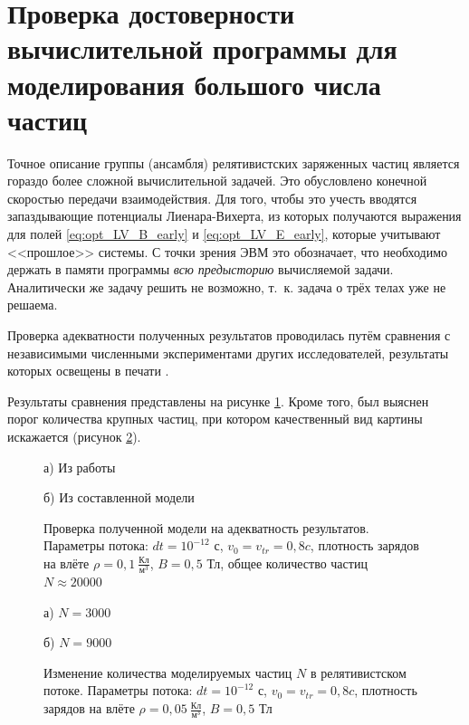 \section{Проверка достоверности вычислительной программы для моделирования большого числа частиц}

Точное описание группы (ансамбля) релятивистских заряженных частиц является гораздо более сложной вычислительной задачей. Это обусловлено конечной скоростью передачи взаимодействия. Для того, чтобы это учесть вводятся запаздывающие потенциалы Лиенара-Вихерта, из которых получаются выражения для полей \eqref{eq:opt_LV_B_early} и \eqref{eq:opt_LV_E_early}, которые учитывают <<прошлое>> системы. 
С точки зрения ЭВМ это обозначает, что необходимо держать в памяти программы \textit{всю предысторию} вычисляемой задачи.
Аналитически же задачу решить не возможно, т.~к. задача о трёх телах уже не решаема. 

Проверка адекватности полученных результатов проводилась путём сравнения с независимыми численными экспериментами других исследователей, результаты которых освещены в печати \cite{kd2004,Kovtun2005,Kovtun2010,Kravchenya2010}.

Результаты сравнения представлены на рисунке \ref{fig:check1}. Кроме того, был выяснен порог количества крупных частиц, при котором качественный вид картины искажается (рисунок \ref{fig:check2}).


\begin{figure}[h!]
\begin{minipage}[h]{0.9\linewidth}
 а) Из работы \cite{kd2004} \\
\end{minipage}
\vfill
\begin{minipage}[h]{0.9\linewidth}
 б) Из составленной модели  \\
\end{minipage}
\caption{Проверка полученной модели на адекватность результатов. Параметры потока: $dt = 10^{-12}$ с, $v_0 = v_{tr} = 0,8 c$, плотность зарядов на влёте $\rho = 0,1 \ \frac{\text{Кл}}{\text{м}^3}$, $B = 0,5$ Тл, общее количество частиц $N \approx 20000$}
\label{fig:check1}
\end{figure}

\begin{figure}[h!]
\begin{minipage}[h]{0.45\linewidth}
 а) $N = 3000$ \\
\end{minipage}
\hfill
\begin{minipage}[h]{0.45\linewidth}
 б) $N = 9000$ \\
\end{minipage}
\caption{Изменение количества моделируемых частиц $N$ в релятивистском потоке. Параметры потока: $dt = 10^{-12}$ с, $v_0 = v_{tr} = 0,8 c$, плотность зарядов на влёте $\rho = 0,05 \ \frac{\text{Кл}}{\text{м}^3}$, $B = 0,5$ Тл}
\label{fig:check2}
\end{figure}




